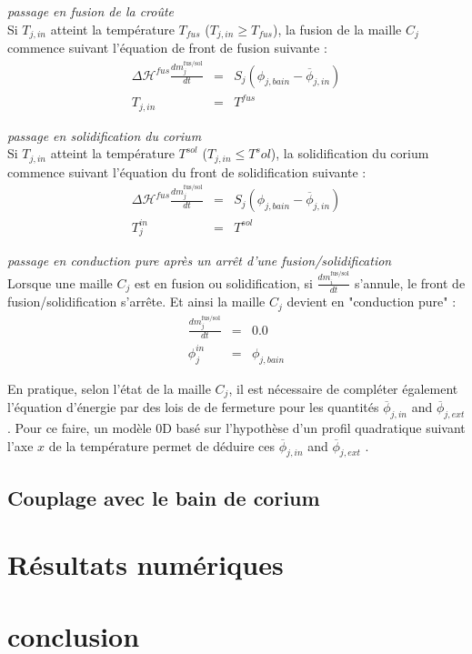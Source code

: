 \documentclass[12pt,a4paper,lmag,nt,article,french]{docDTN}
\begin{document}
{\it passage en fusion de la croûte}\\
Si $T_{j,in}$ atteint la température $T_{fus}$ ($T_{j,in}\ge T_{fus}$), la fusion de la maille $C_j$ commence suivant l'équation de front de fusion suivante :
\begin{eqnarray*}
\Delta \mathcal{H}^{fus} \frac{dm_j^\text{fus/sol}}{dt} &=& S_j\left(\phi_{j,bain} - \overline{\phi}_{j,in}\right) \\
T_{j,in} &=& T^{fus}
\end{eqnarray*}

{\it passage en solidification du corium}\\
Si $T_{j,in}$ atteint la température $T^{sol}$ ($T_{j,in}\le T^sol$), la solidification du corium commence suivant l'équation du front de solidification suivante :
\begin{eqnarray*}
\Delta \mathcal{H}^{fus} \frac{dm_j^\text{fus/sol}}{dt} &=& S_j\left(\phi_{j,bain} - \overline{\phi}_{j,in}\right) \\
T_j^{in} &=& T^{sol}
\end{eqnarray*}

{\it passage en conduction pure après un arrêt d'une fusion/solidification}\\
Lorsque une maille $C_j$ est en fusion ou solidification, si $\frac{dm_i^\text{fus/sol}}{dt}$ s'annule, le front de fusion/solidification s'arrête. Et ainsi la maille $C_j$ devient en "conduction pure" :
\begin{eqnarray*}
\frac{dm_j^\text{fus/sol}}{dt} &=& 0.0 \\
\phi_j^{in} &=& \phi_{j,bain}
\end{eqnarray*}


En pratique, selon l'état de la maille $C_j$, il est nécessaire de compléter également l'équation d'énergie par des lois de de fermeture pour les quantités $\overline{\phi}_{j,in}$ and $\overline{\phi}_{j,ext}$. Pour ce faire, un modèle 0D basé sur l'hypothèse d'un profil quadratique suivant l'axe $x$ de la température permet de déduire ces $\overline{\phi}_{j,in}$ and $\overline{\phi}_{j,ext}$ \cite{LeTellier2016}.

\subsection{Couplage avec le bain de corium}
\section{Résultats numériques}
\section{conclusion}
\end{document}
